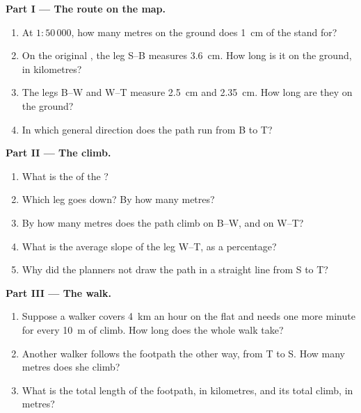 \begin{problem}
\noindent\textbf{Part I --- The route on the map.}\par\nopagebreak
\begin{enumerate}[beginpenalty=10000]
  \item At $1 : 50\,000$, how many metres on the ground does \qty{1}{cm}
        of the  stand for?
  \item On the original , the leg S--B measures \qty{3.6}{cm}. How
        long is it on the ground, in kilometres?
  \item The legs B--W and W--T measure \qty{2.5}{cm} and \qty{2.35}{cm}.
        How long are they on the ground?
  \item In which general direction does the path run from B to T?
\end{enumerate}

\noindent\textbf{Part II --- The climb.}\par\nopagebreak
\begin{enumerate}[resume, beginpenalty=10000]
  \item What is the  of the ?
  \item Which leg goes down? By how many metres?
  \item By how many metres does the path climb on B--W, and on W--T?
  \item What is the average slope of the leg W--T, as a percentage?
  \item Why did the planners not draw the path in a straight line from S
        to T?
\end{enumerate}

\noindent\textbf{Part III --- The walk.}\par\nopagebreak
\begin{enumerate}[resume, beginpenalty=10000]
  \item Suppose a walker covers \qty{4}{km} an hour on the flat and needs
        one more minute for every \qty{10}{m} of climb. How long does the
        whole walk take?
  \item Another walker follows the footpath the other way, from T to S.
        How many metres does she climb?
  \item What is the total length of the footpath, in kilometres, and its
        total climb, in metres?
\end{enumerate}
\end{problem}
